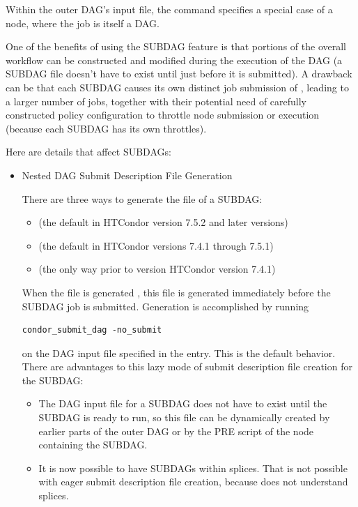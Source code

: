 Within the outer DAG's input file,
the  command specifies a special case of a 
node, where the job is itself a DAG.

One of the benefits of using the SUBDAG feature is that portions of
the overall workflow
can be constructed and modified during the execution of the DAG
(a SUBDAG file doesn't have to exist until just before it is submitted).
A drawback can be that each SUBDAG causes its own distinct job submission
of , leading to a larger number of jobs,
together with their potential need of carefully constructed policy
configuration to throttle node submission or execution (because each
SUBDAG has its own throttles).

Here are details that affect SUBDAGs:
\begin{itemize}
\item{Nested DAG Submit Description File Generation}

There are three ways to generate the  file
of a SUBDAG:

\begin{itemize}
\item {} (the default in HTCondor version 7.5.2 and later versions)
\item {} (the default in HTCondor versions 7.4.1 through 7.5.1)
\item {} (the only way prior to version HTCondor version 7.4.1)
\end{itemize}

When the  file is generated ,
this file is generated immediately
before the SUBDAG job is submitted.
Generation is accomplished by running
\begin{verbatim}
condor_submit_dag -no_submit
\end{verbatim}
on the DAG input file specified in the  entry.
This is the default behavior.
There are advantages to this lazy mode of submit description
file creation for the SUBDAG:
\begin{itemize}
\item The DAG input file for a SUBDAG does not have to exist until the SUBDAG
is ready to run, so this file can be dynamically created by earlier
parts of the outer DAG or by the PRE script of the node containing the SUBDAG.
\item It is now possible to have SUBDAGs within splices. 
That is not
possible with eager submit description file creation,
because  does not understand splices.
\end{itemize}


\end{itemize}
